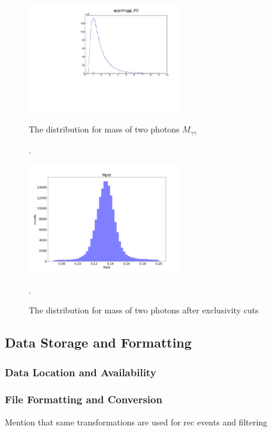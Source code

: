 \begin{figure}[hbt]
	\centering
	\includegraphics[page=6,width=0.6\textwidth]{Chapters/Ch4-BaseAnalysis/pid_figs/eppi0.exclusive.pdf}
	
	\caption{The distribution for mass of two photons $M_{\gamma\gamma}$}.
	\label{fig:ggmass}
	
	\centering
	\includegraphics[width=0.6\textwidth]{Chapters/Ch2-Experiment/recon_pid/pid_figs/Mpi0.png}
	
	\caption{The distribution for mass of two photons after exclusivity cuts}.
	\label{fig:ggmass_after}
	
\end{figure}




\subsection{Data Storage and Formatting}
    \subsubsection{Data Location and Availability}
    \subsubsection{File Formatting and Conversion}\label{sec:filtering}
        Mention that same transformations are used for rec events and filtering
    

